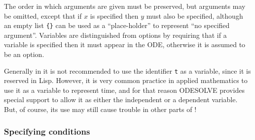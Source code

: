 The order in which arguments are given must be preserved, but
arguments may be omitted, except that if $x$ is specified then $y$
must also be specified, although an empty list \verb|{}| can be used
as a ``place-holder'' to represent ``no specified argument''.
Variables are distinguished from options by requiring that if a
variable is specified then it must appear in the ODE, otherwise it is
assumed to be an option.

Generally in \REDUCE{} it is not recommended to use the identifier
\verb|t| as a variable, since it is reserved in Lisp.  However, it is
very common practice in applied mathematics to use it as a variable to
represent time, and for that reason ODESOLVE provides special support
to allow it as either the independent or a dependent variable.  But,
of course, its use may still cause trouble in other parts of \REDUCE!


\subsubsection{Specifying conditions}

